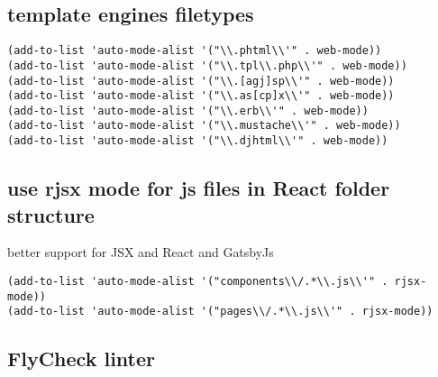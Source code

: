 \documentclass[11pt]{article}
\begin{document}
\subsection*{template engines filetypes}
\label{sec:org5d45a18}

\begin{verbatim}
(add-to-list 'auto-mode-alist '("\\.phtml\\'" . web-mode))
(add-to-list 'auto-mode-alist '("\\.tpl\\.php\\'" . web-mode))
(add-to-list 'auto-mode-alist '("\\.[agj]sp\\'" . web-mode))
(add-to-list 'auto-mode-alist '("\\.as[cp]x\\'" . web-mode))
(add-to-list 'auto-mode-alist '("\\.erb\\'" . web-mode))
(add-to-list 'auto-mode-alist '("\\.mustache\\'" . web-mode))
(add-to-list 'auto-mode-alist '("\\.djhtml\\'" . web-mode))
\end{verbatim}



\subsection*{use rjsx mode for js files in React folder structure}
\label{sec:org8ef7ffe}

better support for JSX and React and GatsbyJs

\begin{verbatim}
(add-to-list 'auto-mode-alist '("components\\/.*\\.js\\'" . rjsx-mode))
(add-to-list 'auto-mode-alist '("pages\\/.*\\.js\\'" . rjsx-mode))
\end{verbatim}




\subsection*{FlyCheck linter}
\label{sec:org14ef9fe}
\end{document}

